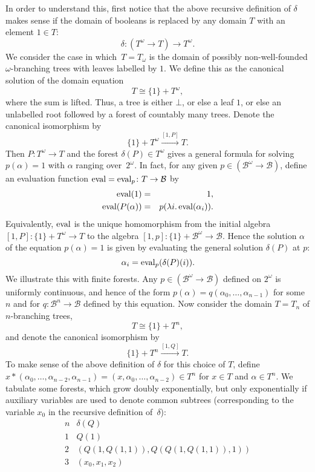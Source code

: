 \documentclass{LMCS}
\renewcommand{\d}{\delta}
\newcommand{\pBool}{\mathcal{B}}
\newcommand{\True}{1}\newcommand{\False}{0}\newcommand{\domain}[1]{{\D_{#1}}}
\newcommand{\D}{D}
\newcommand{\T}{T}
\begin{document}
In order to understand this, first notice that the above recursive
definition of $\d$ makes sense if the domain of booleans is replaced
by any domain $T$ with an element $1 \in T$:
\[
\d \colon (T^\omega \to T) \to \T^\omega.
\]
We consider the case in which~$T=T_{\omega}$ is the domain of possibly
non-well-founded $\omega$-branching trees with leaves labelled by $1$.
We define this as the canonical solution of the domain equation
\[ T \cong \{\True\} + T^\omega,\] where the sum is lifted.  Thus, a
tree is either $\bot$, or else a leaf $1$, or else an unlabelled root
followed by a forest of countably many trees.  Denote the
canonical isomorphism by
\[
\{\True\} + T^\omega  \stackrel{[1,P]}{\longrightarrow}  T.
\]
Then $P \colon T^\omega \to T$ and the forest $\d(P) \in T^\omega$
gives a general formula for solving $p(\alpha)=1$ with $\alpha$
ranging over~$2^\omega$.  In fact, for any given $p \in (\pBool^\omega
\to \pBool)$, define an evaluation function $\eval = \eval_p \colon T
\to \pBool$ by
\begin{eqnarray*}
\eval(\True) & = & \True, \\
   \eval(P(\alpha)) & = & p(\lambda i.\eval(\alpha_i)).
\end{eqnarray*}
Equivalently, $\operatorname{eval}$ is the unique homomorphism
from the initial algebra $[1,P] \colon \{1\} + T^\omega\to T$ to the
algebra $[1, p] \colon \{1\} + \pBool^\omega\to \pBool$.  Hence the
solution $\alpha$ of the equation $p(\alpha)=1$ is given by evaluating
the general solution $\d(P)$ at $p$:
\[ \alpha_i = \eval_p(\d(P)(i)).\] We illustrate this with finite
forests.  Any $p \in (\pBool^\omega\to\pBool)$ defined on $2^\omega$
is uniformly continuous, and hence of the form
$p(\alpha)=q(\alpha_0,\dots,\alpha_{n-1})$ for some~$n$ and for $q
\colon \pBool^n \to \pBool$ defined by this equation.  Now consider
the domain $T=T_n$ of $n$-branching trees,
\[ T \cong \{\True\} + T^n,\] and denote the canonical isomorphism by
\[
\{\True\} + T^n  \stackrel{[1,Q]}{\longrightarrow}  T.
\]
To make sense of the above definition of $\d$ for this choice of $T$,
define $x * (\alpha_0, \dots, \alpha_{n-2},\alpha_{n-1})= (x,
\alpha_0, \dots, \alpha_{n-2}) \in T^n$ for $x \in T$ and $\alpha \in
T^n$. We tabulate some forests, which grow doubly exponentially, but
only exponentially if auxiliary variables are used to denote common
subtrees (corresponding to the variable $x_0$ in the recursive
definition of~$\d$):
\[
\begin{array}{ll}
n & \d(Q) \\ \hline
1 &  Q(1) \\
2 & (Q(1,Q(1,1)), Q(Q(1,Q(1,1)),1))\\
3 & (x_0, x_1, x_2)
\end{array}
\]
\end{document}
